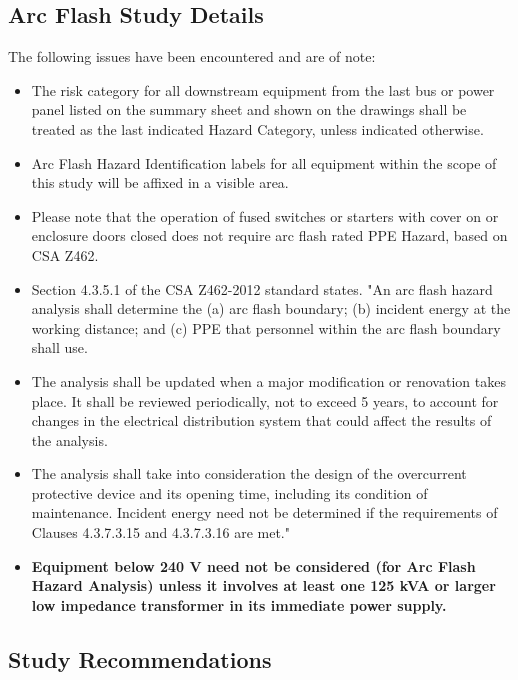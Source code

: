 \subsection{Arc Flash Study Details}
\label{af:results:afsd}

The following issues have been encountered and are of note:

\begin{itemize} 
\item The risk category for all downstream equipment from the last bus or power panel listed on the summary sheet and shown on the drawings shall be treated as the last indicated Hazard Category, unless indicated otherwise.

\item Arc Flash Hazard Identification labels for all equipment within the scope of this study will be affixed in a visible area.

\item Please note that the operation of fused switches or starters with cover on or enclosure doors closed does not require arc flash rated PPE Hazard, based on CSA Z462.

\item Section 4.3.5.1 of the CSA Z462-2012 standard states. "An arc flash hazard analysis shall determine the (a) arc flash boundary; (b) incident energy at the working distance; and (c) PPE that personnel within the arc flash boundary shall use.\cite{CSA}

\item The analysis shall be updated when a major modification or renovation takes place. It shall be reviewed periodically, not to exceed 5 years, to account for changes in the electrical distribution system that could affect the results of the analysis.\cite{CSA}


\item The analysis shall take into consideration the design of the overcurrent protective device and its opening time, including its condition of maintenance. Incident energy need not be determined if the requirements of Clauses 4.3.7.3.15 and 4.3.7.3.16 are met."\cite{CSA}
 
\item\textbf{Equipment below 240 V need not be considered (for Arc Flash Hazard Analysis) unless it involves at least one 125 kVA or larger low impedance transformer in its immediate power supply.}\cite{IEEE}	 
\end{itemize}
\pagebreak
\subsection{Study Recommendations}
\label{af:results:afsr}

